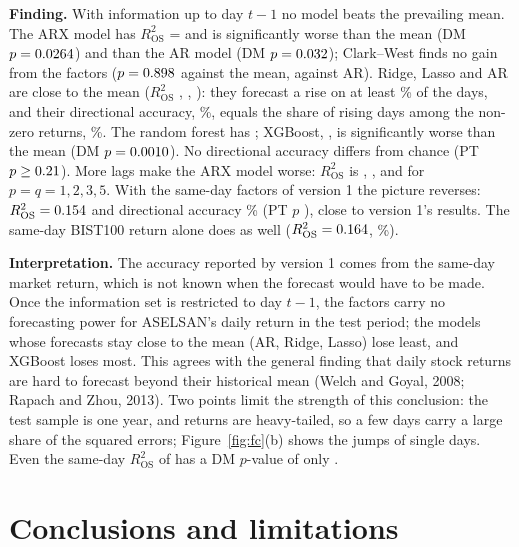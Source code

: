 \documentclass[11pt,a4paper]{article}
\begin{document}
\textbf{Finding.} With information up to day $t-1$ no model beats the prevailing mean. The ARX model has $R^2_{\mathrm{OS}}$ =
\RtwoArx{} and is significantly worse than the mean (DM $p = 0.0264$) and than the AR model (DM $p = 0.032$); Clark--West
finds no gain from the factors ($p = 0.898$ against the mean, \CwArxArP{} against AR). Ridge, Lasso and AR are close to the mean
($R^2_{\mathrm{OS}}$ \RtwoRidge, \RtwoLasso, \RtwoAr): they forecast a rise on at least \PosMin\% of the days, and their directional accuracy,
\DaLasso\%, equals the share of rising days among the \NonzeroDays{} non-zero returns, \UpShare\%. The random forest has
\RtwoRf; XGBoost, \RtwoXgb, is significantly worse than the mean (DM $p = 0.0010$). No directional accuracy differs from chance
(PT $p \ge 0.21$). More lags make the ARX model worse: $R^2_{\mathrm{OS}}$ is \LagRtwoA, \LagRtwoB, \LagRtwoC{} and \LagRtwoD{}
for $p = q = 1, 2, 3, 5$. With the same-day factors of version 1 the picture reverses: $R^2_{\mathrm{OS}} = 0.154$ and
directional accuracy \DaSame\% (PT $p$ \PtPSame), close to version 1's results. The same-day BIST100 return alone does as well
($R^2_{\mathrm{OS}} = 0.164$, \DaBist\%).

\textbf{Interpretation.} The accuracy reported by version 1 comes from the same-day market return, which is not known when the
forecast would have to be made. Once the information set is restricted to day $t-1$, the factors carry no forecasting power for
ASELSAN's daily return in the test period; the models whose forecasts stay close to the mean (AR, Ridge,
Lasso) lose least, and XGBoost loses most. This agrees with the general
finding that daily stock returns are hard to forecast beyond their historical mean (Welch and Goyal, 2008; Rapach and Zhou, 2013).
Two points limit the strength of this conclusion: the test sample is one year, and returns are heavy-tailed, so a few days carry a
large share of the squared errors; Figure~\ref{fig:fc}(b) shows the jumps of single days. Even the same-day $R^2_{\mathrm{OS}}$ of
\RtwoSame{} has a DM $p$-value of only \DmPSame.

\section{Conclusions and limitations}
\end{document}
